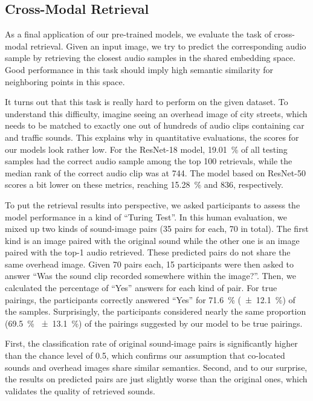 \documentclass[journal]{IEEEtran}
\begin{document}
\subsection{Cross-Modal Retrieval}
As a final application of our pre-trained models,
we evaluate the task of cross-modal retrieval.
Given an input image,
we try to predict the corresponding audio sample by
retrieving the closest audio samples in the shared embedding space.
Good performance in this task should imply
high semantic similarity for neighboring points in this space.

It turns out that this task is really hard to perform on the given dataset.
To understand this difficulty, imagine seeing an overhead image of city streets,
which needs to be matched to
exactly one out of hundreds of audio clips containing car and traffic sounds.
This explains why in quantitative evaluations, the scores for our models look rather low.
For the ResNet-18 model,
\SI{19.01}{\percent} of all testing samples had the correct audio sample among the top 100 retrievals,
while the median rank of the correct audio clip was at 744.
The model based on ResNet-50 scores a bit lower on these metrics,
reaching \SI{15.28}{\percent} and 836, respectively.

To put the retrieval results into perspective,
we asked participants to assess the model performance in a kind of ``Turing Test''.
In this human evaluation,
we mixed up two kinds of sound-image pairs (35 pairs for each, 70 in total).
The first kind is an image paired with the original sound
while the other one is an image paired with the top-1 audio retrieved.
These predicted pairs do not share the same overhead image.
Given 70 pairs each, 15 participants were then asked to answer
``Was the sound clip recorded somewhere within the image?''.
Then, we calculated the percentage of ``Yes'' answers for each kind of pair.
For true pairings, the participants correctly answered ``Yes''
for \SI{71.6}{\percent} (\SI{\pm12.1}{\percent}) of the samples.
Surprisingly, the participants considered nearly the same proportion
(\SI{69.5}{\percent} \SI{\pm13.1}{\percent})
of the pairings suggested by our model to be true pairings.

First, the classification rate of original sound-image pairs is
significantly higher than the chance level of 0.5,
which confirms our assumption that co-located sounds and overhead images share similar semantics.
Second, and to our surprise,
the results on predicted pairs are just slightly worse than the original ones,
which validates the quality of retrieved sounds. 
\end{document}
